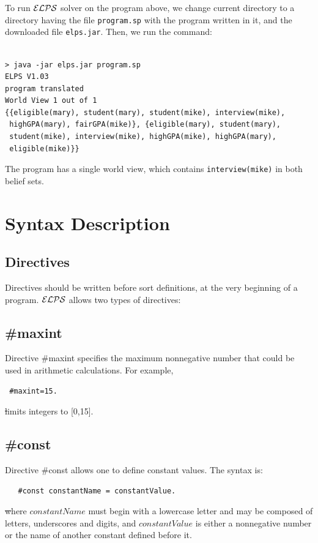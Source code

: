 \documentclass[12pt, letterpaper]{article}
\begin{document}
To run  ${\cal ELPS}$ solver  on the program above, 
we change current directory to a directory having the file \texttt{program.sp} with the program written in it, and the downloaded file \texttt{elps.jar}.  Then, we run the command:
\begin{verbatim}

> java -jar elps.jar program.sp
ELPS V1.03
program translated
World View 1 out of 1
{{eligible(mary), student(mary), student(mike), interview(mike),
 highGPA(mary), fairGPA(mike)}, {eligible(mary), student(mary),
 student(mike), interview(mike), highGPA(mike), highGPA(mary),
 eligible(mike)}}

\end{verbatim}
The program has a single world view, which contains \texttt{interview(mike)} in both belief sets.




\section{Syntax Description}

\subsection{Directives}
Directives should be written before sort definitions, at the very beginning of a program.
${\cal ELPS}$ allows two types of directives:
\subsection*{\#maxint}
Directive \#maxint specifies the maximum nonnegative number that could be used in arithmetic calculations.
For example,
\begin{verbatim}
 #maxint=15.
\end{verbatim}
\st limits integers to [0,15].
\subsection*{\#const}
Directive \#const allows one to define constant values. The syntax is:

\begin{verbatim}
   #const constantName = constantValue.
\end{verbatim}      
\st where $constantName$  must begin with a lowercase letter and may be composed of letters, underscores and digits,
 and $constantValue$ is either a nonnegative number or the name of another constant defined before it.  
\end{document}
